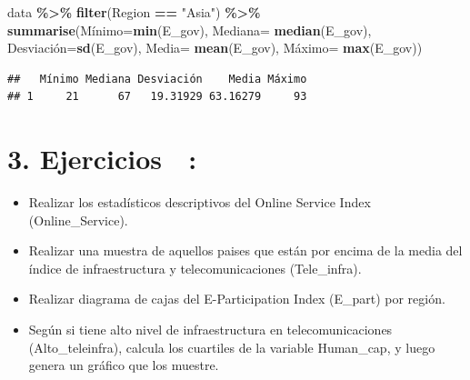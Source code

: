 \documentclass[
]{article}
\newenvironment{Shaded}{\begin{snugshade}}{\end{snugshade}}
\newcommand{\AttributeTok}[1]{\textcolor[rgb]{0.13,0.29,0.53}{#1}}
\newcommand{\FunctionTok}[1]{\textcolor[rgb]{0.13,0.29,0.53}{\textbf{#1}}}
\newcommand{\NormalTok}[1]{#1}
\newcommand{\OtherTok}[1]{\textcolor[rgb]{0.56,0.35,0.01}{#1}}
\newcommand{\SpecialCharTok}[1]{\textcolor[rgb]{0.81,0.36,0.00}{\textbf{#1}}}
\newcommand{\StringTok}[1]{\textcolor[rgb]{0.31,0.60,0.02}{#1}}
\providecommand{\tightlist}{%
  \setlength{\itemsep}{0pt}\setlength{\parskip}{0pt}}
\begin{document}
\begin{Shaded}
\begin{Highlighting}[]
\NormalTok{data }\SpecialCharTok{\%\textgreater{}\%}
  \FunctionTok{filter}\NormalTok{(Region }\SpecialCharTok{==} \StringTok{"Asia"}\NormalTok{) }\SpecialCharTok{\%\textgreater{}\%}
  \FunctionTok{summarise}\NormalTok{(Mínimo}\OtherTok{=}\FunctionTok{min}\NormalTok{(E\_gov), }
            \AttributeTok{Mediana=} \FunctionTok{median}\NormalTok{(E\_gov), }
\NormalTok{            Desviación}\OtherTok{=}\FunctionTok{sd}\NormalTok{(E\_gov),}
            \AttributeTok{Media=} \FunctionTok{mean}\NormalTok{(E\_gov),}
\NormalTok{            Máximo}\OtherTok{=} \FunctionTok{max}\NormalTok{(E\_gov))}
\end{Highlighting}
\end{Shaded}

\begin{verbatim}
##   Mínimo Mediana Desviación    Media Máximo
## 1     21      67   19.31929 63.16279     93
\end{verbatim}

\hypertarget{ejercicios}{%
\section{\texorpdfstring{\textbf{3. Ejercicios 👾
:}}{3. Ejercicios 👾 :}}\label{ejercicios}}

\begin{itemize}
\tightlist
\item
  Realizar los estadísticos descriptivos del Online Service Index
  (Online\_Service).
\item
  Realizar una muestra de aquellos paises que están por encima de la
  media del índice de infraestructura y telecomunicaciones
  (Tele\_infra).
\item
  Realizar diagrama de cajas del E-Participation Index (E\_part) por
  región.
\item
  Según si tiene alto nivel de infraestructura en telecomunicaciones
  (Alto\_teleinfra), calcula los cuartiles de la variable Human\_cap, y
  luego genera un gráfico que los muestre.
\end{itemize}
\end{document}
